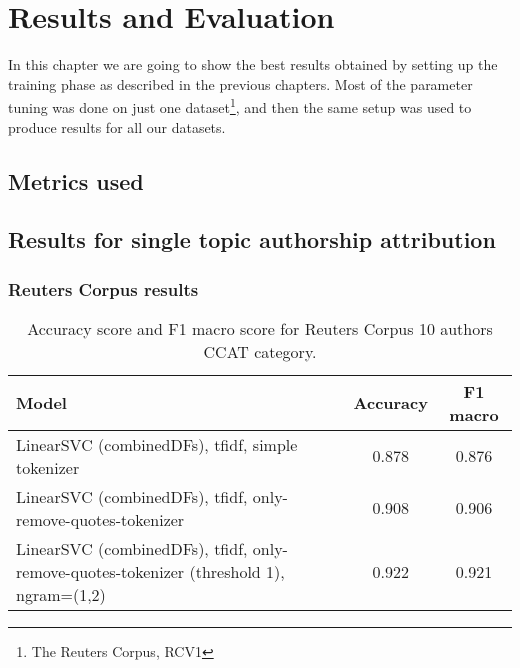 \chapter{Results and Evaluation}
In this chapter we are going to show the best results obtained by setting up the training phase as described in the previous chapters. Most of the parameter tuning was done on just one dataset\footnote{The Reuters Corpus, RCV1}, and then the same setup was used to produce results for all our datasets.
\section{Metrics used}

\section{Results for single topic authorship attribution}
\subsection{Reuters Corpus results}

\begin{table}[h!]
	\begin{center}  
		\caption[Reuters Corpus Results - 10 authors]{Accuracy score and F1 macro score for Reuters Corpus 10 authors CCAT category.} 
		\label{tab:tableRCV1_10}
		\begin{tabular}{| p{5 cm} | c | c |}
			\hline 
			Model & Accuracy & F1 macro \\
			\hline
			LinearSVC (combinedDFs), tfidf, simple tokenizer & 0.878 & 0.876 \\ \hline
			LinearSVC (combinedDFs), tfidf, only-remove-quotes-tokenizer & 0.908 & 0.906 \\ \hline
			LinearSVC (combinedDFs), tfidf, only-remove-quotes-tokenizer (threshold 1),
			ngram=(1,2) & 0.922 & 0.921 \\ \hline
		\end{tabular} 
	\end{center}
\end{table}

